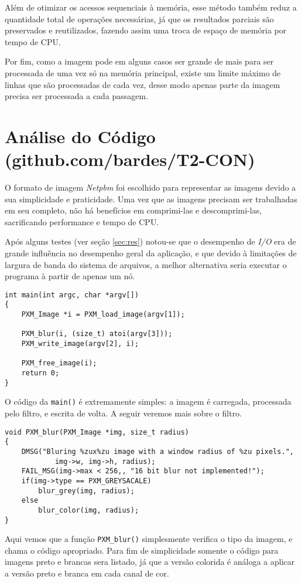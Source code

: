 \documentclass[11pt,towside]{article}
\begin{document}
Além de otimizar os acessos sequenciais à memória, esse método também reduz a quantidade total de operações necessárias, já que os resultados parciais são preservados e reutilizados, fazendo assim uma troca de espaço de memória por tempo de CPU.

Por fim, como a imagem pode em alguns casos ser grande de mais para ser processada de uma vez só na memória principal, existe um limite máximo de linhas que são processadas de cada vez, desse modo apenas parte da imagem precisa ser processada a cada passagem.

\break
\section{Análise do Código (github.com/bardes/T2-CON)}
O formato de imagem \emph{Netpbm}\cite{netpbm} foi escolhido para representar as imagens devido a sua simplicidade e praticidade. Uma vez que as imagens precisam ser trabalhadas em seu completo, não há benefícios em comprimi-las e descomprimi-las, sacrificando performance e tempo de CPU.

Após alguns testes (ver seção \ref{sec:res}) notou-se que o desempenho de \emph{I/O} era de grande influência no desempenho geral da aplicação, e que devido à limitações de largura de banda do sistema de arquivos, a melhor alternativa seria executar o programa à partir de apenas um nó.

\begin{lstlisting}
int main(int argc, char *argv[])
{
    PXM_Image *i = PXM_load_image(argv[1]);

    PXM_blur(i, (size_t) atoi(argv[3]));
    PXM_write_image(argv[2], i);

    PXM_free_image(i);
    return 0;
}
\end{lstlisting}


O código da \texttt{main()} é extremamente simples: a imagem é carregada, processada pelo filtro, e escrita de volta. A seguir veremos mais sobre o filtro.

\begin{lstlisting}
void PXM_blur(PXM_Image *img, size_t radius)
{   
    DMSG("Bluring %zux%zu image with a window radius of %zu pixels.",
            img->w, img->h, radius);
    FAIL_MSG(img->max < 256,, "16 bit blur not implemented!");
    if(img->type == PXM_GREYSACALE)
        blur_grey(img, radius);
    else
        blur_color(img, radius);
}
\end{lstlisting}

Aqui vemos que a função \texttt{PXM\_blur()} simplesmente verifica o tipo da imagem, e chama o código apropriado. Para fim de simplicidade somente o código para imagens preto e brancas sera listado, já que a versão colorida é análoga a aplicar a versão preto e branca em cada canal de cor.
\end{document}
